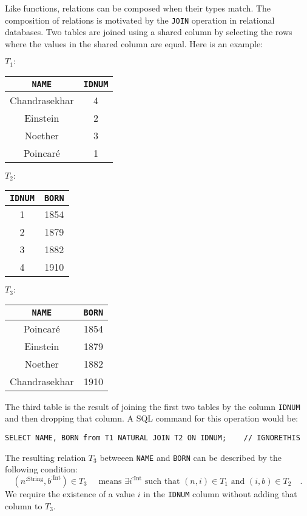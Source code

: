 Like functions, relations can be composed when their types match.
The composition of relations is motivated by the \lstinline!JOIN!
operation in relational databases. Two tables are joined using a shared
column by selecting the rows where the values in the shared column
are equal. Here is an example:
\begin{center}
\hfill{}$T_{1}:$ %
\begin{tabular}{|c|c|}
\hline 
{\footnotesize{}}\lstinline!NAME! & {\footnotesize{}}\lstinline!IDNUM!\tabularnewline
\hline 
\hline 
{\footnotesize{}Chandrasekhar} & {\footnotesize{}4}\tabularnewline
\hline 
{\footnotesize{}Einstein} & {\footnotesize{}2}\tabularnewline
\hline 
{\footnotesize{}Noether} & {\footnotesize{}3}\tabularnewline
\hline 
{\footnotesize{}Poincar\'e} & {\footnotesize{}1}\tabularnewline
\hline 
\end{tabular}\hfill{}$T_{2}:$ %
\begin{tabular}{|c|c|}
\hline 
{\footnotesize{}}\lstinline!IDNUM! & {\footnotesize{}}\lstinline!BORN!\tabularnewline
\hline 
\hline 
{\footnotesize{}1} & {\footnotesize{}1854}\tabularnewline
\hline 
{\footnotesize{}2} & {\footnotesize{}1879}\tabularnewline
\hline 
{\footnotesize{}3} & {\footnotesize{}1882}\tabularnewline
\hline 
{\footnotesize{}4} & {\footnotesize{}1910}\tabularnewline
\hline 
\end{tabular}\hfill{}\hfill{}$T_{3}:$ %
\begin{tabular}{|c|c|}
\hline 
{\footnotesize{}}\lstinline!NAME! & {\footnotesize{}}\lstinline!BORN!\tabularnewline
\hline 
\hline 
{\footnotesize{}Poincar\'e} & {\footnotesize{}1854}\tabularnewline
\hline 
{\footnotesize{}Einstein} & {\footnotesize{}1879}\tabularnewline
\hline 
{\footnotesize{}Noether} & {\footnotesize{}1882}\tabularnewline
\hline 
{\footnotesize{}Chandrasekhar} & {\footnotesize{}1910}\tabularnewline
\hline 
\end{tabular}\hfill{}
\par\end{center}

The third table is the result of joining the first two tables by the
column \lstinline!IDNUM! and then dropping that column. A SQL command
for this operation would be:
\begin{lstlisting}
SELECT NAME, BORN from T1 NATURAL JOIN T2 ON IDNUM;    // IGNORETHIS
\end{lstlisting}
The resulting relation $T_{3}$ betweeen \lstinline!NAME! and \lstinline!BORN!
can be described by the following condition: 
\[
(n^{:\text{String}},b^{:\text{Int}})\in T_{3}\quad\text{ means }\exists i^{:\text{Int}}\text{ such that }(n,i)\in T_{1}\text{ and }(i,b)\in T_{2}\quad.
\]
We require the existence of a value $i$ in the \lstinline!IDNUM!
column without adding that column to $T_{3}$.

